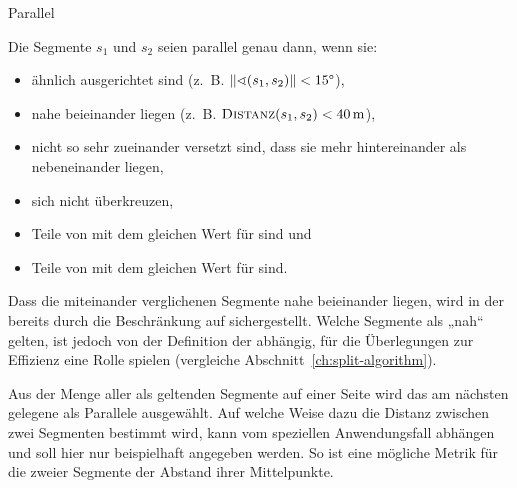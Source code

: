 \documentclass[../main/thesis.tex]{subfiles}
\begin{document}
\begin{algorithmhere}{Parallel}
\label{alg:Parallel}
\begin{algorithmic}
	\State Die Segmente $s_1$ und $s_2$ seien parallel genau dann, wenn sie:
	\begin{itemize}[nosep,leftmargin=3.5em]
		\item ähnlich ausgerichtet sind (z.~B. $|\!\;\!|\sphericalangle (s_1, s_2)|\!\;\!| < 15\degree$),
		\item nahe beieinander liegen (z.~B. $\textproc{Distanz}(s_1, s_2) < \unit[40]{m}$),
		\item nicht so sehr zueinander versetzt sind, dass sie mehr hintereinander als nebeneinander liegen,  %
		\item sich nicht überkreuzen,  %
		\item Teile von  mit dem gleichen Wert für  sind und
		\item Teile von  mit dem gleichen Wert für  sind.
	\end{itemize}
\EndFunction
\end{algorithmic}
\end{algorithmhere}

Dass die miteinander verglichenen Segmente nahe beieinander liegen, wird in der  bereits durch die Beschränkung auf  sichergestellt.
Welche Segmente als „nah“ gelten, ist jedoch von der Definition der  abhängig, für die Überlegungen zur Effizienz eine Rolle spielen (vergleiche Abschnitt~\ref{ch:split-algorithm}).


Aus der Menge aller als  geltenden Segmente auf einer Seite wird das am nächsten gelegene als Parallele ausgewählt.
Auf welche Weise dazu die Distanz zwischen zwei Segmenten bestimmt wird, kann vom speziellen Anwendungsfall abhängen und soll hier nur beispielhaft angegeben werden.
So ist eine mögliche Metrik für die  zweier Segmente der Abstand ihrer Mittelpunkte.

\end{document}
